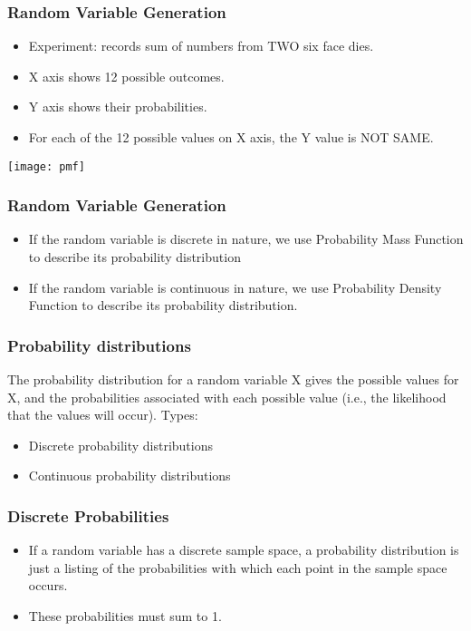 \begin{frame}\frametitle{Random Variable Generation}
\begin{itemize}
\item  Experiment: records sum of numbers from TWO six face dies.
\item X axis shows 12 possible outcomes.
\item Y axis shows their probabilities.
\item For each of the 12 possible values on X axis, the Y value is NOT SAME.
\end{itemize}

\begin{center}
\texttt{[image: pmf]}
\end{center}
\end{frame}

\begin{frame}\frametitle{Random Variable Generation}
\begin{itemize}
\item  If the random variable is discrete in nature, we use Probability Mass
Function to describe its probability distribution
\item If the random variable is continuous in nature, we use Probability
Density Function to describe its probability distribution.
\end{itemize}
\end{frame}

\begin{frame}
\frametitle{Probability distributions}
The probability distribution for a random variable X gives the possible 
values for X, and the probabilities associated with each possible value 
(i.e., the likelihood that the values will occur). 
Types:
\begin{itemize}
\item Discrete probability distributions 
\item Continuous probability distributions 
\end{itemize}
\end{frame}

\begin{frame}
\frametitle{Discrete Probabilities}

\begin{itemize}
\item If a random variable has a discrete sample space, a probability
distribution is just a listing of the probabilities with which each
point in the sample space occurs.  
\item These probabilities must sum to 1.
\end{itemize}
\end{frame}



